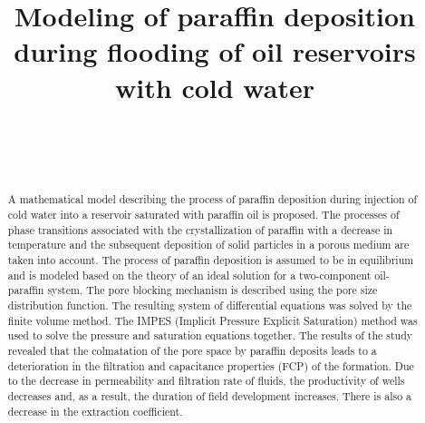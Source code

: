 \documentclass[
11pt,%
tightenlines,%
twoside,%
onecolumn,%
nofloats,%
nobibnotes,%
nofootinbib,%
superscriptaddress,%
noshowpacs,%
centertags]%
{revtex4-2}
\begin{document}
\title{Modeling of paraffin deposition during flooding of oil reservoirs with cold water}
\author{~}  
\author{~}




\begin{abstract} 
	A mathematical model describing the process of paraffin deposition during injection of cold water into a reservoir saturated with paraffin oil is proposed. The processes of phase transitions associated with the crystallization of paraffin with a decrease in temperature and the subsequent deposition of solid particles in a porous medium are taken into account. The process of paraffin deposition is assumed to be in equilibrium and is modeled based on the theory of an ideal solution for a two-component oil-paraffin system. The pore blocking mechanism is described using the pore size distribution function. The resulting system of differential equations was solved by the finite volume method. The IMPES (Implicit Pressure Explicit Saturation) method was used to solve the pressure and saturation equations together. The results of the study revealed that the colmatation of the pore space by paraffin deposits leads to a deterioration in the filtration and capacitance properties (FCP) of the formation. Due to the decrease in permeability and filtration rate of fluids, the productivity of wells decreases and, as a result, the duration of field development increases. There is also a decrease in the extraction coefficient.
\end{abstract}


%
\end{document}
